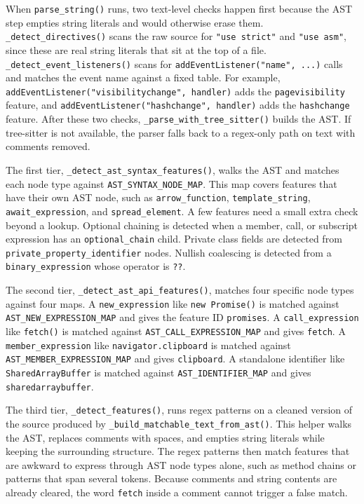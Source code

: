 When \texttt{parse\_string()} runs, two text-level checks happen first because the AST step empties string literals and would otherwise erase them. \texttt{\_detect\_directives()} scans the raw source for \texttt{"use strict"} and \texttt{"use asm"}, since these are real string literals that sit at the top of a file. \texttt{\_detect\_event\_listeners()} scans for \texttt{addEventListener("name", ...)} calls and matches the event name against a fixed table. For example, \texttt{addEventListener("visibilitychange", handler)} adds the \texttt{pagevisibility} feature, and \texttt{addEventListener("hashchange", handler)} adds the \texttt{hashchange} feature. After these two checks, \texttt{\_parse\_with\_tree\_sitter()} builds the AST. If tree-sitter is not available, the parser falls back to a regex-only path on text with comments removed.

The first tier, \texttt{\_detect\_ast\_syntax\_features()}, walks the AST and matches each node type against \texttt{AST\_SYNTAX\_NODE\_MAP}. This map covers features that have their own AST node, such as \texttt{arrow\_function}, \texttt{template\_string}, \texttt{await\_expression}, and \texttt{spread\_element}. A few features need a small extra check beyond a lookup. Optional chaining is detected when a member, call, or subscript expression has an \texttt{optional\_chain} child. Private class fields are detected from \texttt{private\_property\_identifier} nodes. Nullish coalescing is detected from a \texttt{binary\_expression} whose operator is \texttt{??}.

The second tier, \texttt{\_detect\_ast\_api\_features()}, matches four specific node types against four maps. A \texttt{new\_expression} like \texttt{new Promise()} is matched against \texttt{AST\_NEW\_EXPRESSION\_MAP} and gives the feature ID \texttt{promises}. A \texttt{call\_expression} like \texttt{fetch()} is matched against \texttt{AST\_CALL\_EXPRESSION\_MAP} and gives \texttt{fetch}. A \texttt{member\_expression} like \texttt{navigator.clipboard} is matched against \texttt{AST\_MEMBER\_EXPRESSION\_MAP} and gives \texttt{clipboard}. A standalone identifier like \texttt{SharedArrayBuffer} is matched against \texttt{AST\_IDENTIFIER\_MAP} and gives \texttt{sharedarraybuffer}.

The third tier, \texttt{\_detect\_features()}, runs regex patterns on a cleaned version of the source produced by \texttt{\_build\_matchable\_text\_from\_ast()}. This helper walks the AST, replaces comments with spaces, and empties string literals while keeping the surrounding structure. The regex patterns then match features that are awkward to express through AST node types alone, such as method chains or patterns that span several tokens. Because comments and string contents are already cleared, the word \texttt{fetch} inside a comment cannot trigger a false match.

